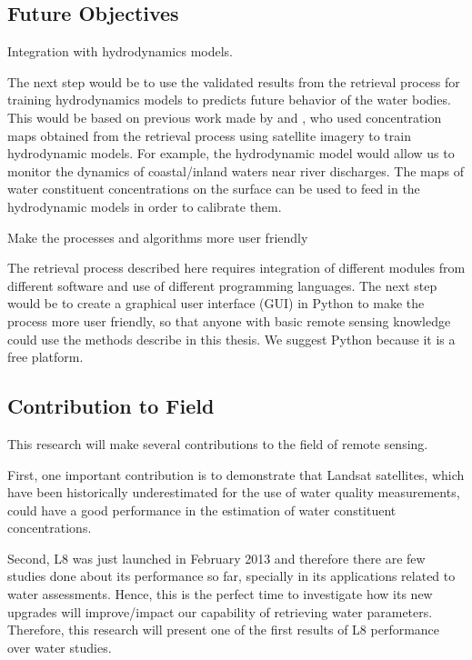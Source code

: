 \subsection{Future Objectives}
	\begin{enumerate}
			{\bf \item Integration with hydrodynamics models.  } 

The next step would be to use the validated results from the retrieval process for training hydrodynamics models to predicts future behavior of the water bodies. This would be based on previous work made by \cite{Pahlevan:2012} and \cite{GeraceThesis}, who used concentration maps obtained from the retrieval process using satellite imagery to train hydrodynamic models. For example, the hydrodynamic model would allow us to monitor the dynamics of coastal/inland waters near river discharges. The maps of water constituent concentrations on the surface can be used to feed in the hydrodynamic models in order to calibrate them. 

			{\bf \item Make the processes and algorithms more user friendly} 

The retrieval process described here requires integration of different modules from different software and use of different programming languages. The next step would be to create a graphical user interface (GUI) in Python to make the process more user friendly, so that anyone with basic remote sensing knowledge could use the methods describe in this thesis. We suggest Python because it is a free platform.

	\end{enumerate}	

		

\subsection{Contribution to Field}
\label{subsec:contributiontofield}
This research will make several contributions to the field of remote sensing.

First, one important contribution is to demonstrate that Landsat satellites, which have been historically underestimated for the use of water quality measurements, could have a good performance in the estimation of water constituent concentrations.

Second, L8 was just launched in February 2013 and therefore there are few studies done about its performance so far, specially in its applications related to water assessments. Hence, this is the perfect time to investigate how its new upgrades will improve/impact our capability of retrieving water parameters. Therefore, this research will present one of the first results of L8 performance over water studies.  

